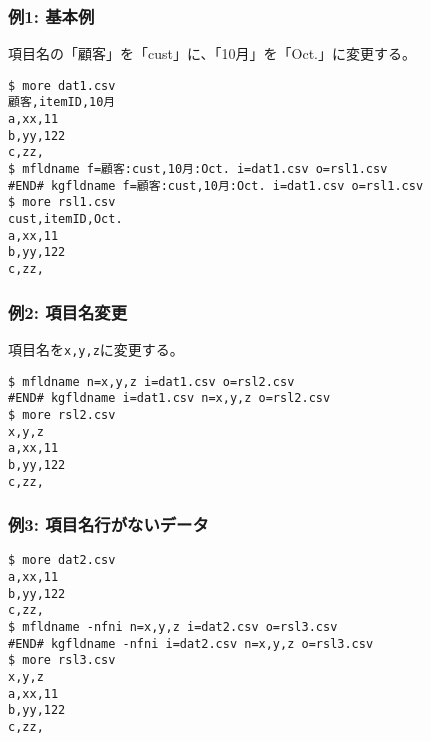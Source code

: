 \subsubsection*{例1: 基本例}

項目名の「顧客」を「cust」に、「10月」を「Oct.」に変更する。


\begin{Verbatim}[baselinestretch=0.7,frame=single]
$ more dat1.csv
顧客,itemID,10月
a,xx,11
b,yy,122
c,zz,
$ mfldname f=顧客:cust,10月:Oct. i=dat1.csv o=rsl1.csv
#END# kgfldname f=顧客:cust,10月:Oct. i=dat1.csv o=rsl1.csv
$ more rsl1.csv
cust,itemID,Oct.
a,xx,11
b,yy,122
c,zz,
\end{Verbatim}
\subsubsection*{例2: 項目名変更}

項目名を\verb|x,y,z|に変更する。


\begin{Verbatim}[baselinestretch=0.7,frame=single]
$ mfldname n=x,y,z i=dat1.csv o=rsl2.csv
#END# kgfldname i=dat1.csv n=x,y,z o=rsl2.csv
$ more rsl2.csv
x,y,z
a,xx,11
b,yy,122
c,zz,
\end{Verbatim}
\subsubsection*{例3: 項目名行がないデータ}



\begin{Verbatim}[baselinestretch=0.7,frame=single]
$ more dat2.csv
a,xx,11
b,yy,122
c,zz,
$ mfldname -nfni n=x,y,z i=dat2.csv o=rsl3.csv
#END# kgfldname -nfni i=dat2.csv n=x,y,z o=rsl3.csv
$ more rsl3.csv
x,y,z
a,xx,11
b,yy,122
c,zz,
\end{Verbatim}
